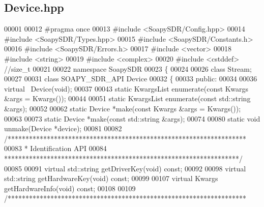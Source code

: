 \subsection{Device.\+hpp}
\label{Device_8hpp_source}

\begin{DoxyCode}
00001 
00012 \textcolor{preprocessor}{#pragma once}
00013 \textcolor{preprocessor}{#include <SoapySDR/Config.hpp>}
00014 \textcolor{preprocessor}{#include <SoapySDR/Types.hpp>}
00015 \textcolor{preprocessor}{#include <SoapySDR/Constants.h>}
00016 \textcolor{preprocessor}{#include <SoapySDR/Errors.h>}
00017 \textcolor{preprocessor}{#include <vector>}
00018 \textcolor{preprocessor}{#include <string>}
00019 \textcolor{preprocessor}{#include <complex>}
00020 \textcolor{preprocessor}{#include <cstddef>} \textcolor{comment}{//size\_t}
00021 
00022 \textcolor{keyword}{namespace }SoapySDR
00023 \{
00024 
00026 \textcolor{keyword}{class }Stream;
00027 
00031 \textcolor{keyword}{class }SOAPY_SDR_API Device
00032 \{
00033 \textcolor{keyword}{public}:
00034 
00036     \textcolor{keyword}{virtual} ~Device(\textcolor{keywordtype}{void});
00037 
00043     \textcolor{keyword}{static} KwargsList enumerate(\textcolor{keyword}{const} Kwargs &args = Kwargs());
00044 
00051     \textcolor{keyword}{static} KwargsList enumerate(\textcolor{keyword}{const} std::string &args);
00052 
00062     \textcolor{keyword}{static} Device *make(\textcolor{keyword}{const} Kwargs &args = Kwargs());
00063 
00073     \textcolor{keyword}{static} Device *make(\textcolor{keyword}{const} std::string &args);
00074 
00080     \textcolor{keyword}{static} \textcolor{keywordtype}{void} unmake(Device *device);
00081 
00082     \textcolor{comment}{/*******************************************************************}
00083 \textcolor{comment}{     * Identification API}
00084 \textcolor{comment}{     ******************************************************************/}
00085 
00091     \textcolor{keyword}{virtual} std::string getDriverKey(\textcolor{keywordtype}{void}) \textcolor{keyword}{const};
00092 
00098     \textcolor{keyword}{virtual} std::string getHardwareKey(\textcolor{keywordtype}{void}) \textcolor{keyword}{const};
00099 
00107     \textcolor{keyword}{virtual} Kwargs getHardwareInfo(\textcolor{keywordtype}{void}) \textcolor{keyword}{const};
00108 
00109     \textcolor{comment}{/*******************************************************************}

\end{DoxyCode}
